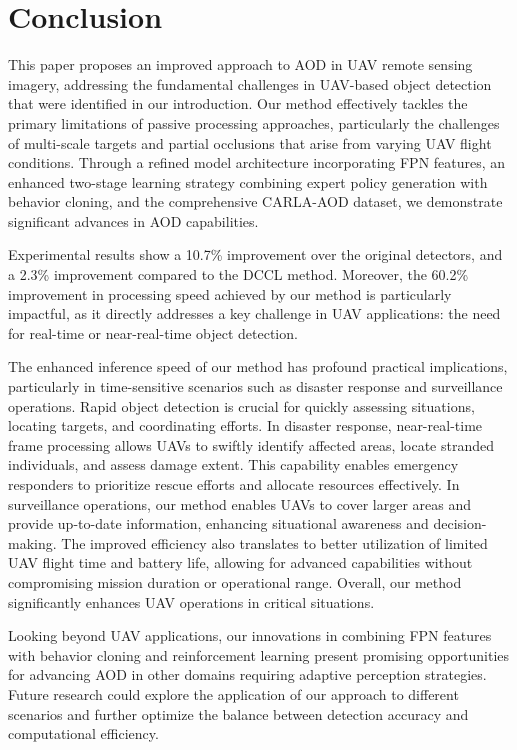 \documentclass[lettersize,journal]{IEEEtran}
\begin{document}
\section{Conclusion}
This paper proposes an improved approach to AOD in UAV remote sensing imagery, addressing the fundamental challenges in UAV-based object detection that were identified in our introduction.  Our method effectively tackles the primary limitations of passive processing approaches, particularly the challenges of multi-scale targets and partial occlusions that arise from varying UAV flight conditions.  Through a refined model architecture incorporating FPN features, an enhanced two-stage learning strategy combining expert policy generation with behavior cloning, and the comprehensive CARLA-AOD dataset, we demonstrate significant advances in AOD capabilities.

Experimental results show a 10.7\% improvement over the original detectors, and a 2.3\% improvement compared to the DCCL method. Moreover, the 60.2\% improvement in processing speed achieved by our method is particularly impactful, as it directly addresses a key challenge in UAV applications: the need for real-time or near-real-time object detection.

The enhanced inference speed of our method has profound practical implications, particularly in time-sensitive scenarios such as disaster response and surveillance operations. Rapid object detection is crucial for quickly assessing situations, locating targets, and coordinating efforts. In disaster response, near-real-time frame processing allows UAVs to swiftly identify affected areas, locate stranded individuals, and assess damage extent. This capability enables emergency responders to prioritize rescue efforts and allocate resources effectively. In surveillance operations, our method enables UAVs to cover larger areas and provide up-to-date information, enhancing situational awareness and decision-making. The improved efficiency also translates to better utilization of limited UAV flight time and battery life, allowing for advanced capabilities without compromising mission duration or operational range. Overall, our method significantly enhances UAV operations in critical situations.

Looking beyond UAV applications, our innovations in combining FPN features with behavior cloning and reinforcement learning present promising opportunities for advancing AOD in other domains requiring adaptive perception strategies.  Future research could explore the application of our approach to different scenarios and further optimize the balance between detection accuracy and computational efficiency.
\end{document}
